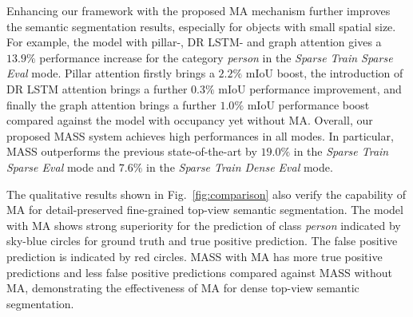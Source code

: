 \documentclass[lettersize,journal]{IEEEtran}
\begin{document}
Enhancing our framework with the proposed MA mechanism further improves the semantic segmentation results, especially for objects with small spatial size. 
For example, the model with pillar-, DR LSTM- and graph attention gives a $13.9\%$ performance increase for the category \emph{person} in the \emph{Sparse Train Sparse Eval} mode.
Pillar attention firstly brings a $2.2\%$ mIoU boost, the introduction of DR LSTM attention brings a further $0.3\%$ mIoU performance improvement, and finally the graph attention brings a further $1.0\%$ mIoU performance boost compared against the model with occupancy yet without MA.
Overall, our proposed MASS system achieves high performances in all modes. In particular, MASS outperforms the previous state-of-the-art by $19.0\%$ in the \emph{Sparse Train Sparse Eval} mode and $7.6\%$ in the \emph{Sparse Train Dense Eval} mode.

The qualitative results shown in Fig.~\ref{fig:comparison} also verify the capability of MA for detail-preserved fine-grained top-view semantic segmentation.
The model with MA shows strong superiority for the prediction of class \emph{person} indicated by sky-blue circles for ground truth and true positive prediction. The false positive prediction is indicated by red circles. MASS with MA has more true positive predictions and less false positive predictions compared against MASS without MA, demonstrating the effectiveness of MA for dense top-view semantic segmentation.
\end{document}
